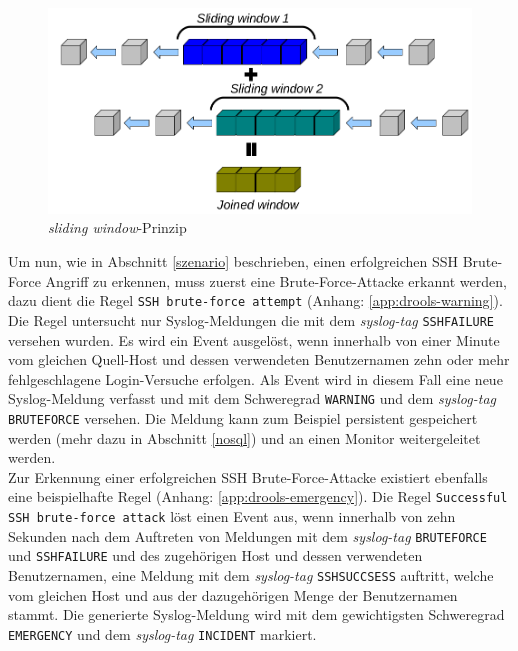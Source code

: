 \begin{figure}[htbp]
    \caption{\textit{sliding window}-Prinzip}
    \label{pic:drools}\vspace{0.2cm}
    \centering
    \includegraphics[scale=0.36]{img/drools-slide-00}
    
\end{figure}

Um nun, wie in Abschnitt \ref{szenario} beschrieben, einen erfolgreichen SSH Brute-Force 
Angriff zu erkennen, muss zuerst eine Brute-Force-Attacke erkannt werden, dazu dient die 
Regel \texttt{SSH brute-force attempt} (Anhang: \ref{app:drools-warning}). Die Regel 
untersucht nur Syslog-Meldungen die mit dem \textit{syslog-tag} \texttt{SSHFAILURE} 
versehen wurden. Es wird ein Event ausgelöst, wenn innerhalb von einer Minute vom 
gleichen Quell-Host und dessen verwendeten Benutzernamen zehn oder mehr fehlgeschlagene 
Login-Versuche erfolgen. Als Event wird in diesem Fall eine neue Syslog-Meldung verfasst 
und mit dem Schweregrad \texttt{WARNING} und dem \textit{syslog-tag} \texttt{BRUTEFORCE} 
versehen. Die Meldung kann zum Beispiel persistent gespeichert werden (mehr dazu in 
Abschnitt \ref{nosql}) und an einen Monitor weitergeleitet werden.\\

Zur Erkennung einer erfolgreichen SSH Brute-Force-Attacke existiert ebenfalls eine 
beispielhafte Regel (Anhang: \ref{app:drools-emergency}). Die Regel \texttt{Successful 
SSH brute-force attack} löst einen Event aus, wenn innerhalb von zehn Sekunden nach dem 
Auftreten von Meldungen mit dem \textit{syslog-tag} \texttt{BRUTEFORCE} und 
\texttt{SSHFAILURE} und des zugehörigen Host und dessen verwendeten Benutzernamen, eine 
Meldung mit dem \textit{syslog-tag} \texttt{SSHSUCCSESS} auftritt, welche vom 
gleichen Host und aus der dazugehörigen Menge der Benutzernamen stammt.
Die generierte Syslog-Meldung wird mit dem gewichtigsten Schweregrad \texttt{EMERGENCY} 
und dem \textit{syslog-tag} \texttt{INCIDENT} markiert.\\

